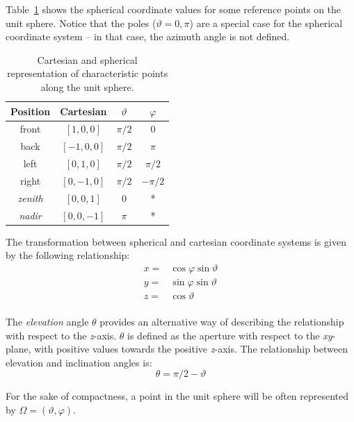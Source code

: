 Table~\ref{tab:cartesian} shows the spherical coordinate values for some reference points on the unit sphere.
Notice that the poles ($\vartheta = 0, \pi$) are a special case for the spherical coordinate system -- in that case, the azimuth angle is not defined. \\


\begin{table}[hb!]
\centering
\caption{Cartesian and spherical representation of characteristic points along the unit sphere.}
  \begin{tabular}{cccc}
  \toprule
    Position & Cartesian & $\vartheta$ & $\varphi$ \\
\midrule
	front & $[1, 0, 0]$ & $\pi/2$ & $0$ \\
	back & $[-1, 0, 0]$ & $\pi/2$ & $\pi$ \\
	left & $[0, 1, 0]$ & $\pi/2$ & $\pi/2$ \\
	right & $[0, -1, 0]$ & $\pi/2$ & $-\pi/2$ \\
    \textit{zenith} & $[0, 0, 1]$ & $0$ & * \\
    \textit{nadir}  & $[0, 0, -1]$ & $\pi$ & * \\
    \bottomrule
  \end{tabular}
\label{tab:cartesian}
\end{table}

\newpage

The transformation between spherical and cartesian coordinate systems is given by the following relationship:
\begin{equation}
	\begin{aligned}
		x = & \cos{\varphi} \sin{\vartheta}\\
		y = & \sin{\varphi} \sin{\vartheta}\\
		z = & \cos{\vartheta}\\
	\end{aligned}
\end{equation}

The \textit{elevation} angle $\theta$ provides an alternative way of describing the relationship with respect to the \textit{z}-axis. $\theta$ is defined as  the aperture with respect to the \textit{xy}-plane, with positive values towards the positive \textit{z}-axis. The relationship between elevation and inclination angles is:
\begin{equation}
	\theta = \pi/2 - \vartheta
\end{equation}


For the sake of compactness, a point in the unit sphere will be often represented by $\Omega = (\vartheta, \varphi)$.\\

